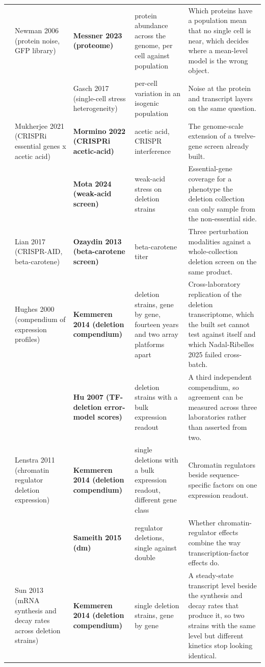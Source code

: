 \begin{landscape}
\begin{longtable}{@{}r@{\hspace{4pt}} L{42mm} L{44mm} L{48mm} L{96mm}@{}}
 & Newman 2006 (protein noise, GFP library) & \textbf{Messner 2023 (proteome)} & protein abundance across the genome, per cell against population & Which proteins have a population mean that no single cell is near, which decides where a mean-level model is the wrong object. \\
 &  & Gasch 2017 (single-cell stress heterogeneity) & per-cell variation in an isogenic population & Noise at the protein and transcript layers on the same question. \\
 & Mukherjee 2021 (CRISPRi essential genes x acetic acid) & \textbf{Mormino 2022 (CRISPRi acetic-acid)} & acetic acid, CRISPR interference & The genome-scale extension of a twelve-gene screen already built. \\
 &  & \textbf{Mota 2024 (weak-acid screen)} & weak-acid stress on deletion strains & Essential-gene coverage for a phenotype the deletion collection can only sample from the non-essential side. \\
 & Lian 2017 (CRISPR-AID, beta-carotene) & \textbf{Ozaydin 2013 (beta-carotene screen)} & beta-carotene titer & Three perturbation modalities against a whole-collection deletion screen on the same product. \\
 & Hughes 2000 (compendium of expression profiles) & \textbf{Kemmeren 2014 (deletion compendium)} & deletion strains, gene by gene, fourteen years and two array platforms apart & Cross-laboratory replication of the deletion transcriptome, which the built set cannot test against itself and which Nadal-Ribelles 2025 failed cross-batch. \\
 &  & \textbf{Hu 2007 (TF-deletion error-model scores)} & deletion strains with a bulk expression readout & A third independent compendium, so agreement can be measured across three laboratories rather than asserted from two. \\
 & Lenstra 2011 (chromatin regulator deletion expression) & \textbf{Kemmeren 2014 (deletion compendium)} & single deletions with a bulk expression readout, different gene class & Chromatin regulators beside sequence-specific factors on one expression readout. \\
 &  & \textbf{Sameith 2015 (dm)} & regulator deletions, single against double & Whether chromatin-regulator effects combine the way transcription-factor effects do. \\
 & Sun 2013 (mRNA synthesis and decay rates across deletion strains) & \textbf{Kemmeren 2014 (deletion compendium)} & single deletion strains, gene by gene & A steady-state transcript level beside the synthesis and decay rates that produce it, so two strains with the same level but different kinetics stop looking identical. \\

\end{longtable}
\end{landscape}

